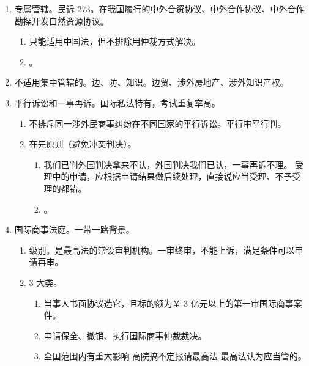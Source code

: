 \begin{enumerate}
\begin{enumerate}
\begin{enumerate}
                \end{enumerate}
          \item 专属管辖。民诉 273。在我国履行的中外合资协议、中外合作协议、中外合作勘探开发自然资源协议。
                \begin{enumerate}
                  \item 只能适用中国法，但不排除用仲裁方式解决。
                  \item {}。
                \end{enumerate}
          \item 不适用集中管辖的。边、防、知识。边贸、涉外房地产、涉外知识产权。
          \item 平行诉讼和一事再诉。国际私法特有，考试重复率高。
                \begin{enumerate}
                  \item 不排斥同一涉外民商事纠纷在不同国家的平行诉讼。平行审平行判。
                  \item 在先原则（避免冲突判决）。
                        \begin{enumerate}
                          \item 我们已判外国判决拿来不认，外国判决我们已认，一事再诉不理。
                                受理中的申请，应根据申请结果做后续处理，直接说应当受理、不予受理的都错。
                          \item {}。
                        \end{enumerate}
                \end{enumerate}
          \item 国际商事法庭。一带一路背景。
                \begin{enumerate}
                  \item 级别。是最高法的常设审判机构。一审终审，不能上诉，满足条件可以申请再审。
                  \item 3 大类。
                        \begin{enumerate}
                          \item 当事人书面协议选它，且标的额为￥ 3 亿元以上的第一审国际商事案件。
                          \item 申请保全、撤销、执行国际商事仲裁裁决。
                          \item 全国范围内有重大影响 \yjt 高院搞不定报请最高法 \yjt 最高法认为应当管的。
                        \end{enumerate}

\end{enumerate}
\end{enumerate}
\end{enumerate}
